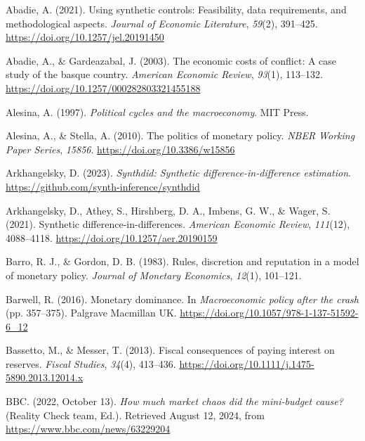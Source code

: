 \documentclass[
  a4paper,
  abstract=true]{scrartcl}
\newlength{\cslhangindent}
\newenvironment{CSLReferences}[2] %
 {\begin{list}{}{%
  \setlength{\itemindent}{0pt}
  \setlength{\leftmargin}{0pt}
  \setlength{\parsep}{0pt}
  \ifodd #1
   \setlength{\leftmargin}{\cslhangindent}
   \setlength{\itemindent}{-1\cslhangindent}
  \fi
  \setlength{\itemsep}{#2\baselineskip}}}
 {\end{list}}
\theoremstyle{definition}
\begin{document}
\label{refs}
\begin{CSLReferences}{1}{0}
Abadie, A. (2021). Using synthetic controls: Feasibility, data
requirements, and methodological aspects. \emph{Journal of Economic
Literature}, \emph{59}(2), 391--425.
\url{https://doi.org/10.1257/jel.20191450}

Abadie, A., \& Gardeazabal, J. (2003). The economic costs of conflict: A
case study of the basque country. \emph{American Economic Review},
\emph{93}(1), 113--132. \url{https://doi.org/10.1257/000282803321455188}

Alesina, A. (1997). \emph{Political cycles and the macroeconomy}. MIT
Press.

Alesina, A., \& Stella, A. (2010). The politics of monetary policy.
\emph{NBER Working Paper Series}, \emph{15856}.
\url{https://doi.org/10.3386/w15856}

Arkhangelsky, D. (2023). \emph{Synthdid: Synthetic
difference-in-difference estimation}.
\url{https://github.com/synth-inference/synthdid}

Arkhangelsky, D., Athey, S., Hirshberg, D. A., Imbens, G. W., \& Wager,
S. (2021). Synthetic difference-in-differences. \emph{American Economic
Review}, \emph{111}(12), 4088--4118.
\url{https://doi.org/10.1257/aer.20190159}

Barro, R. J., \& Gordon, D. B. (1983). Rules, discretion and reputation
in a model of monetary policy. \emph{Journal of Monetary Economics},
\emph{12}(1), 101--121.

Barwell, R. (2016). Monetary dominance. In \emph{Macroeconomic policy
after the crash} (pp. 357--375). Palgrave Macmillan UK.
\url{https://doi.org/10.1057/978-1-137-51592-6_12}

Bassetto, M., \& Messer, T. (2013). Fiscal consequences of paying
interest on reserves. \emph{Fiscal Studies}, \emph{34}(4), 413--436.
\url{https://doi.org/10.1111/j.1475-5890.2013.12014.x}

BBC. (2022, October 13). \emph{How much market chaos did the mini-budget
cause?} (Reality Check team, Ed.). Retrieved August 12, 2024, from
\url{https://www.bbc.com/news/63229204}


\end{CSLReferences}
\end{document}
